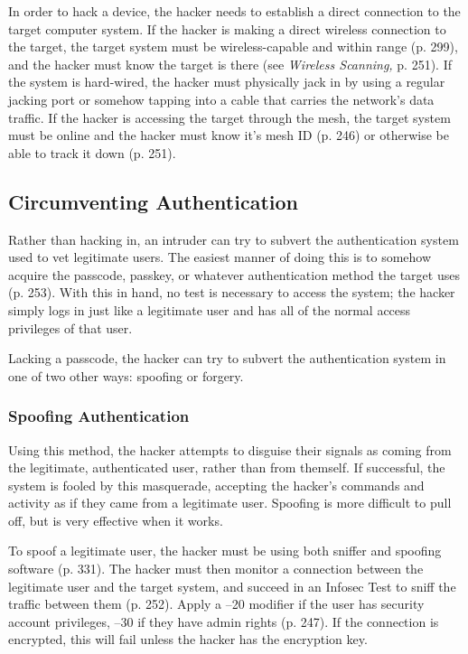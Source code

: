 In order to hack a device, the hacker needs to establish 
a direct connection to the target computer system. If 
the hacker is making a direct wireless connection to 
the target, the target system must be wireless-capable 
and within range (p. 299), and the hacker must know 
the target is there (see \textit{Wireless Scanning,} p. 251). If 
the system is hard-wired, the hacker must physically 
jack in by using a regular jacking port or somehow 
tapping into a cable that carries the network's data 
traffic. If the hacker is accessing the target through the 
mesh, the target system must be online and the hacker 
must know it's mesh ID (p. 246) or otherwise be able 
to track it down (p. 251).

\subsection{Circumventing Authentication}

Rather than hacking in, an intruder can try to subvert
the authentication system used to vet legitimate
users. The easiest manner of doing this is to somehow 
acquire the passcode, passkey, or whatever authentication
method the target uses (p. 253). With this in hand,
no test is necessary to access the system; the hacker 
simply logs in just like a legitimate user and has all of 
the normal access privileges of that user.

Lacking a passcode, the hacker can try to subvert 
the authentication system in one of two other ways: 
spoofing or forgery.

\subsubsection{Spoofing Authentication}

Using this method, the hacker attempts to disguise 
their signals as coming from the legitimate, authenticated
user, rather than from themself. If successful,
the system is fooled by this masquerade, accepting the 
hacker's commands and activity as if they came from 
a legitimate user. Spoofing is more difficult to pull off, 
but is very effective when it works.

To spoof a legitimate user, the hacker must be using 
both sniffer and spoofing software (p. 331). The 
hacker must then monitor a connection between the 
legitimate user and the target system, and succeed 
in an Infosec Test to sniff the traffic between them 
(p. 252). Apply a –20 modifier if the user has security
account privileges, –30 if they have admin rights
(p. 247). If the connection is encrypted, this will fail 
unless the hacker has the encryption key.

